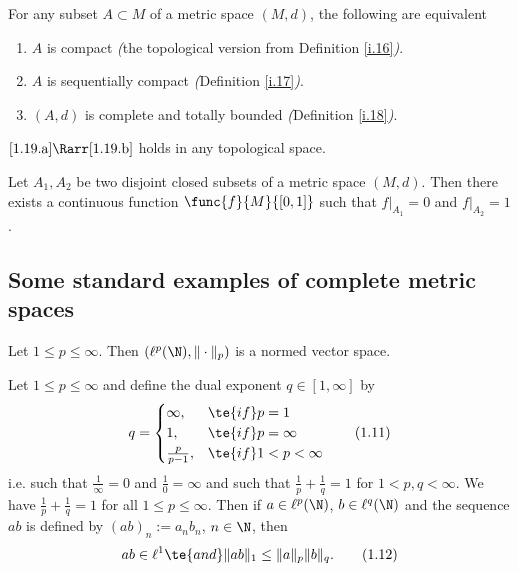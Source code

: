 \begin{thm}\label{i.19}
    For any subset $A\subset M$ of a metric space $(M,d)$, the following are equivalent
    \begin{enumerate}[label=\alph*)]
        \item $A$ is compact \emph{(}the topological version from Definition \ref{i.16}\emph{)}.\label{1.19.a}
        \item $A$ is sequentially compact \emph{(}Definition \ref{i.17}\emph{)}.\label{1.19.b}
        \item $(A,d)$ is complete and totally bounded \emph{(}Definition \ref{i.18}\emph{)}.\label{1.19.c}
    \end{enumerate}

    $\ref{1.19.a}\Rarr \ref{1.19.b}$ holds in any topological space.
\end{thm}

\begin{lem}[Urysohn]\label{i.20}
    Let $A_1,A_2$ be two disjoint closed subsets of a metric space $(M,d)$. 
    Then there exists a continuous function $\func{f}{M}{[0,1]}$ such that $f|_{A_1}=0$ and $f|_{A_2}=1$.
\end{lem}

\subsection{Some standard examples of complete metric spaces}

\begin{lem}\label{i.21}
    Let $1\leq p\leq\infty$. Then $(\ell^p(\N),\|\cdot\|_p)$ is a normed vector space.
\end{lem}

\begin{lem}\label{i.22}
    Let $1\leq p\leq\infty$ and define the dual exponent $q\in[1,\infty]$ by
    \[q=\begin{cases}\infty,&\te{if }p=1\\1,&\te{if }p=\infty\\\frac{p}{p-1},&\te{if }1<p<\infty\end{cases}\label{1.11}\tag{1.11}\]
    i.e. such that $\frac{1}{\infty}=0$ and $\frac{1}{0}=\infty$ and such that $\frac{1}{p}+\frac{1}{q}=1$ for $1<p,q<\infty$. We have $\frac{1}{p}+\frac{1}{q}=1$ for all $1\leq p\leq\infty$. Then if $a\in\ell^p(\N)$, $b\in\ell^q(\N)$ and the sequence $ab$ is defined by $(ab)_n:=a_nb_n$, $n\in\N$, then
    \[ab\in\ell^1\te{ and }\|ab\|_1\leq\|a\|_p\|b\|_q.\tag{1.12}\label{1.12}\]
\end{lem}

